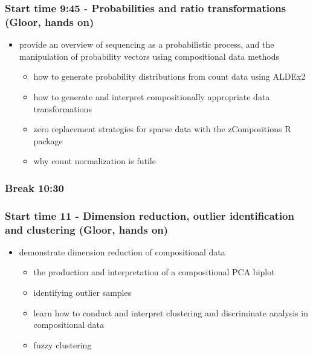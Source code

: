 \documentclass[twocolumn]{article}
\providecommand{\tightlist}{%
  \setlength{\itemsep}{0pt}\setlength{\parskip}{0pt}}
\begin{document}
\hypertarget{start-time-945---probabilities-and-ratio-transformations-gloor-hands-on}{%
\subsubsection{Start time 9:45 - Probabilities and ratio transformations
(Gloor, hands
on)}\label{start-time-945---probabilities-and-ratio-transformations-gloor-hands-on}}

\begin{itemize}
\tightlist
\item
  provide an overview of sequencing as a probabilistic process, and the
  manipulation of probability vectors using compositional data methods

  \begin{itemize}
  \tightlist
  \item
    how to generate probability distributions from count data using
    ALDEx2
  \item
    how to generate and interpret compositionally appropriate data
    transformations
  \item
    zero replacement strategies for sparse data with the zCompositions R
    package
  \item
    why count normalization is futile
  \end{itemize}
\end{itemize}

\hypertarget{break-1030}{%
\subsubsection{Break 10:30}\label{break-1030}}

\hypertarget{start-time-11---dimension-reduction-outlier-identification-and-clustering-gloor-hands-on}{%
\subsubsection{Start time 11 - Dimension reduction, outlier
identification and clustering (Gloor, hands
on)}\label{start-time-11---dimension-reduction-outlier-identification-and-clustering-gloor-hands-on}}

\begin{itemize}
\tightlist
\item
  demonstrate dimension reduction of compositional data

  \begin{itemize}
  \tightlist
  \item
    the production and interpretation of a compositional PCA biplot
  \item
    identifying outlier samples
  \item
    learn how to conduct and interpret clustering and discriminate
    analysis in compositional data
  \item
    fuzzy clustering
  \end{itemize}
\end{itemize}
\end{document}
